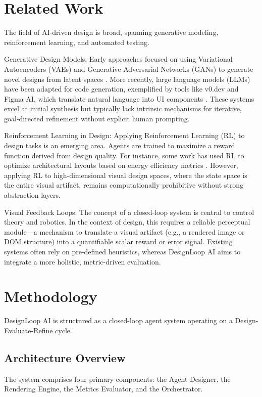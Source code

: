 \documentclass[11pt,a4paper]{article}
\begin{document}
\section{Related Work}
The field of AI-driven design is broad, spanning generative modeling, reinforcement learning, and automated testing.

Generative Design Models: Early approaches focused on using Variational Autoencoders (VAEs) and Generative Adversarial Networks (GANs) to generate novel designs from latent spaces \cite{goodfellow2014}. More recently, large language models (LLMs) have been adapted for code generation, exemplified by tools like v0.dev and Figma AI, which translate natural language into UI components \cite{openai2023}. These systems excel at initial synthesis but typically lack intrinsic mechanisms for iterative, goal-directed refinement without explicit human prompting.

Reinforcement Learning in Design: Applying Reinforcement Learning (RL) to design tasks is an emerging area. Agents are trained to maximize a reward function derived from design quality. For instance, some work has used RL to optimize architectural layouts based on energy efficiency metrics \cite{lecun2015}. However, applying RL to high-dimensional visual design spaces, where the state space is the entire visual artifact, remains computationally prohibitive without strong abstraction layers.

Visual Feedback Loops: The concept of a closed-loop system is central to control theory and robotics. In the context of design, this requires a reliable perceptual module—a mechanism to translate a visual artifact (e.g., a rendered image or DOM structure) into a quantifiable scalar reward or error signal. Existing systems often rely on pre-defined heuristics, whereas DesignLoop AI aims to integrate a more holistic, metric-driven evaluation.

\section{Methodology}
DesignLoop AI is structured as a closed-loop agent system operating on a Design-Evaluate-Refine cycle.

\subsection{Architecture Overview}
The system comprises four primary components: the Agent Designer, the Rendering Engine, the Metrics Evaluator, and the Orchestrator.
\end{document}
